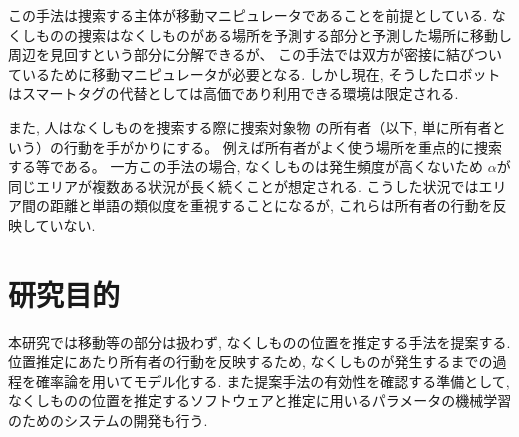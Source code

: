 この手法は捜索する主体が移動マニピュレータであることを前提としている. 
なくしものの捜索はなくしものがある場所を予測する部分と予測した場所に移動し周辺を見回すという部分に分解できるが、
この手法では双方が密接に結びついているために移動マニピュレータが必要となる. 
しかし現在, そうしたロボットはスマートタグの代替としては高価であり利用できる環境は限定される. 

また, 人はなくしものを捜索する際に捜索対象物
の所有者（以下, 単に所有者という）の行動を手がかりにする。
例えば所有者がよく使う場所を重点的に捜索する等である。
一方この手法の場合, なくしものは発生頻度が高くないため
$\alpha$が同じエリアが複数ある状況が長く続くことが想定される. 
こうした状況ではエリア間の距離と単語の類似度を重視することになるが, これらは所有者の行動を反映していない. 


\section{研究目的}
本研究では移動等の部分は扱わず, なくしものの位置を推定する手法を提案する. 
位置推定にあたり所有者の行動を反映するため, なくしものが発生するまでの過程を確率論を用いてモデル化する. 
また提案手法の有効性を確認する準備として, なくしものの位置を推定するソフトウェアと推定に用いるパラメータの機械学習のためのシステムの開発も行う. 
